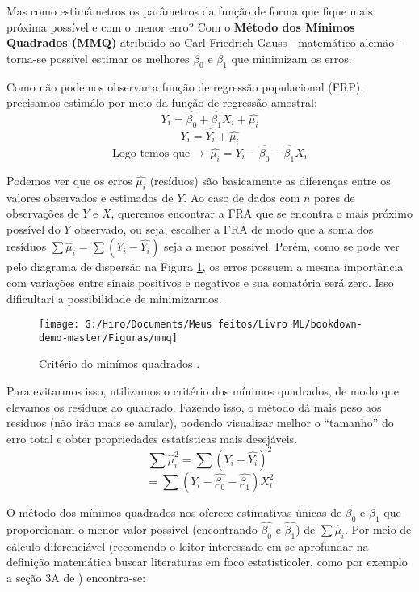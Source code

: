 \documentclass[
]{book}
\begin{document}
Mas como estimâmetros os parâmetros da função de forma que fique mais próxima possível e com o menor erro? Com o \textbf{Método dos Mínimos Quadrados (MMQ)} atribuído ao Carl Friedrich Gauss - matemático alemão - torna-se possível estimar os melhores \(\beta_0\) e \(\beta_1\) que minimizam os erros.

Como não podemos observar a função de regressão populacional (FRP), precisamos estimálo por meio da função de regressão amostral:
\[Y_i=\hat{\beta_0}+\hat{\beta_1}X_i+\hat{\mu_i} \]
\[Y_i=\hat{Y_i}+\hat{\mu_i}\]
\[\mbox{Logo temos que} \rightarrow \ \hat{\mu_i}=Y_i-\hat{\beta_0}-\hat{\beta_1} X_i\]

Podemos ver que os erros \(\hat{\mu_i}\) (resíduos) são basicamente as diferenças entre os valores observados e estimados de \(Y\). Ao caso de dados com \(n\) pares de observações de \(Y\) e \(X\), queremos encontrar a FRA que se encontra o mais próximo possível do \(Y\) observado, ou seja, escolher a
FRA de modo que a soma dos resíduos \(\sum \hat{\mu}_i=\sum(Y_i-\hat{Y_i})\) seja a menor possível. Porém, como se pode ver pelo diagrama de dispersão na Figura \ref{fig:mmq}, os erros possuem a mesma importância com variações entre sinais positivos e negativos e sua somatória será zero. Isso dificultari a possibilidade de minimizarmos.

\begin{figure}

{\centering \texttt{[image: G:/Hiro/Documents/Meus feitos/Livro ML/bookdown-demo-master/Figuras/mmq]} 

}

\caption{Critério do minímos quadrados \citet{gujarati2011econometria}.}\label{fig:mmq}
\end{figure}



Para evitarmos isso, utilizamos o critério dos mínimos quadrados, de modo que elevamos os resíduos ao quadrado. Fazendo isso, o método dá mais peso aos resíduos (não irão mais se anular), podendo visualizar melhor o ``tamanho'' do erro total e obter propriedades estatísticas mais desejáveis.
\[\sum \hat{\mu}^2_i=\sum(Y_i-\hat{Y_i})^2 \]
\begin{equation}
    = \sum (Y_i-\hat{\beta_0}-\hat{\beta_1})X_i^2 
    \label{eq:mmqeq}
\end{equation}

O método dos mínimos quadrados nos oferece estimativas únicas de \(\beta_0\) e \(\beta_1\) que proporcionam o menor valor possível (encontrando \(\hat{\beta_0}\) e \(\hat{\beta_1}\)) de \(\sum \hat{\mu}_i\). Por meio de cálculo diferenciável (recomendo o leitor interessado em se aprofundar na definição matemática buscar literaturas em foco estatísticoler, como por exemplo a seção 3A de \citet{gujarati2011econometria}) encontra-se:
\end{document}
